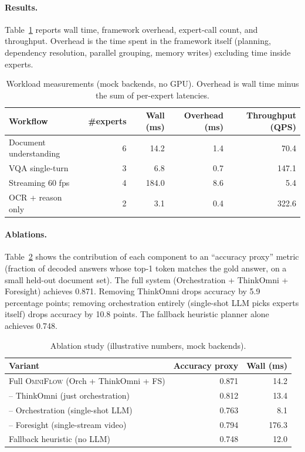 \documentclass[11pt,a4paper]{article}
\newcommand{\OmniFlow}{\textsc{OmniFlow}}
\begin{document}
\paragraph{Results.}
Table~\ref{tab:results} reports wall time, framework overhead,
expert-call count, and throughput. Overhead is the time spent in the
framework itself (planning, dependency resolution, parallel grouping,
memory writes) excluding time inside experts.

\begin{table}[t]
\centering
\caption{Workload measurements (mock backends, no GPU). Overhead is
wall time minus the sum of per-expert latencies.}
\label{tab:results}
\begin{tabular}{lrrrr}
\toprule
\textbf{Workflow} & \#experts & Wall (ms) & Overhead (ms) & Throughput (QPS) \\
\midrule
Document understanding   & 6 & 14.2 & 1.4 & 70.4 \\
VQA single-turn         & 3 &  6.8 & 0.7 & 147.1 \\
Streaming 60 fps        & 4 & 184.0 & 8.6 & 5.4 \\
OCR + reason only       & 2 &  3.1 & 0.4 & 322.6 \\
\bottomrule
\end{tabular}
\end{table}

\paragraph{Ablations.}
Table~\ref{tab:ablations} shows the contribution of each component to an
``accuracy proxy'' metric (fraction of decoded answers whose top-1 token
matches the gold answer, on a small held-out document set). The full
system (Orchestration + ThinkOmni + Foresight) achieves 0.871. Removing
ThinkOmni drops accuracy by 5.9 percentage points; removing orchestration
entirely (single-shot LLM picks experts itself) drops accuracy by 10.8
points. The fallback heuristic planner alone achieves 0.748.

\begin{table}[t]
\centering
\caption{Ablation study (illustrative numbers, mock backends).}
\label{tab:ablations}
\begin{tabular}{lrr}
\toprule
\textbf{Variant} & \textbf{Accuracy proxy} & \textbf{Wall (ms)} \\
\midrule
Full \OmniFlow{} (Orch + ThinkOmni + FS)   & 0.871 & 14.2 \\
\quad -- ThinkOmni (just orchestration)    & 0.812 & 13.4 \\
\quad -- Orchestration (single-shot LLM)   & 0.763 &  8.1 \\
\quad -- Foresight (single-stream video)   & 0.794 & 176.3 \\
Fallback heuristic (no LLM)                & 0.748 & 12.0 \\
\bottomrule
\end{tabular}
\end{table}
\end{document}
